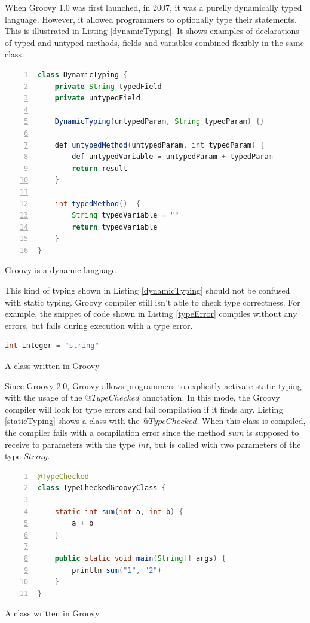 \documentclass[preprint]{sigplanconf}
\begin{document}
When Groovy 1.0 was first launched, in 2007, it was a purelly dynamically typed language.
However, it allowed programmers to optionally type their statements.
This is illustrated in Listing \ref{dynamicTyping}. 
It shows examples of declarations of typed and untyped methods, fields and variables combined flexibly in the same class.


\begin{Listing}[ht]
\begin{lstlisting}[language=Java,tabsize=2,breaklines=true,numbers=left]
class DynamicTyping {
	private String typedField
	private untypedField

	DynamicTyping(untypedParam, String typedParam) {}

	def untypedMethod(untypedParam, int typedParam) {
		def untypedVariable = untypedParam + typedParam
		return result
	}

	int typedMethod()  {
		String typedVariable = ""
		return typedVariable
	}
}
\end{lstlisting}
\caption{Groovy is a dynamic language}
\label{dynamicTyping}
\end{Listing}

This kind of typing shown in Listing \ref{dynamicTyping} should not be confused with static typing.
Groovy compiler still isn't able to check type correctness.
For example, the snippet of code shown in Listing \ref{typeError} compiles without any errors, but fails during execution with a type error.

\begin{Listing}[ht]
\begin{lstlisting}[language=Java,tabsize=2,breaklines=true]
int integer = "string"
\end{lstlisting}
\caption{A class written in Groovy}
\label{typeError}
\end{Listing}

Since Groovy 2.0, Groovy allows programmers to explicitly activate static typing with the usage of the $@TypeChecked$ annotation.
In this mode, the Groovy compiler will look for type errors and fail compilation if it finds any.
Listing \ref{staticTyping} shows a class with the $@TypeChecked$.
When this class is compiled, the compiler fails with a compilation error since the method $sum$ is supposed to receive to parameters with the type $int$, but is called with two parameters of the type $String$.

\begin{Listing}[ht]
\begin{lstlisting}[language=Java,tabsize=2,breaklines=true,numbers=left]
@TypeChecked
class TypeCheckedGroovyClass {
	
	static int sum(int a, int b) {
		a + b
	}

	public static void main(String[] args) {
		println sum("1", "2")
	}
}
\end{lstlisting}
\caption{A class written in Groovy}
\label{staticTyping}
\end{Listing}
\end{document}
